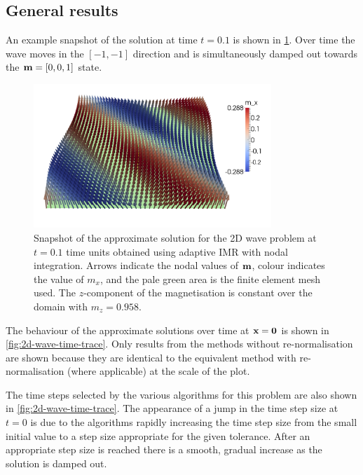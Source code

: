\subsection{General results}

An example snapshot of the solution at time $t=0.1$ is shown in \cref{fig:2d-wave-snapshot}.
Over time the wave moves in the $[-1,-1]$ direction and is simultaneously damped out towards the $\boldsymbol{\mathrm{m}} = [0,0,1]$ state.

\begin{figure}
  \centering
  \includegraphics[width=0.8\textwidth]{images/2d_wave_picture_t0p1.pdf}
  \caption{Snapshot of the approximate solution for the 2D wave problem at $t=0.1$ time units obtained using adaptive IMR with nodal integration.
    Arrows indicate the nodal values of $\boldsymbol{\mathrm{m}}$, colour indicates the value of $m_x$, and the pale green area is the finite element mesh used.
    The $z$-component of the magnetisation is constant over the domain with $m_z = 0.958$.}
  \label{fig:2d-wave-snapshot}
\end{figure}

The behaviour of the approximate solutions over time at $\boldsymbol{\mathrm{x}} = \mathbf{0}$ is shown in \cref{fig:2d-wave-time-trace}.
Only results from the methods without re-normalisation are shown because they are identical to the equivalent method with re-normalisation (where applicable) at the scale of the plot.

The time steps selected by the various algorithms for this problem are also shown in \cref{fig:2d-wave-time-trace}.
The appearance of a jump in the time step size at $t=0$ is due to the algorithms rapidly increasing the time step size from the small initial value to a step size appropriate for the given tolerance.
After an appropriate step size is reached there is a smooth, gradual increase as the solution is damped out.

